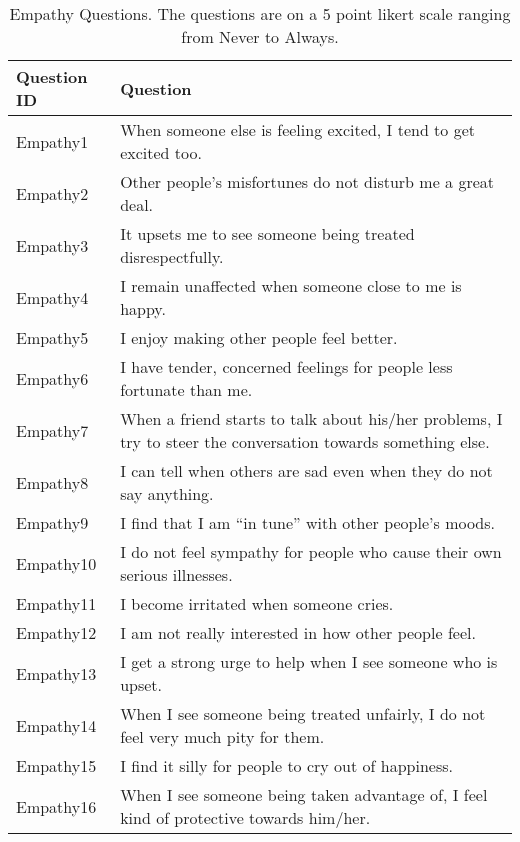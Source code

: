 \begin{table}[!hbpt]
    \footnotesize
    \centering
    \begin{tabularx}{\linewidth}{l|X}
    \toprule
         Question ID & Question \\
         \midrule
         Empathy1 & When someone else is feeling excited, I tend to get excited too. \\
         Empathy2 & Other people’s misfortunes do not disturb me a great deal. \\
         Empathy3 & It upsets me to see someone being treated disrespectfully. \\
         Empathy4 & I remain unaffected when someone close to me is happy. \\
         Empathy5 & I enjoy making other people feel better. \\
         Empathy6 & I have tender, concerned feelings for people less fortunate than me. \\
         Empathy7 & When a friend starts to talk about his/her problems, I try to steer the conversation towards something else. \\
         Empathy8 & I can tell when others are sad even when they do not say anything. \\
         Empathy9 & I find that I am “in tune” with other people’s moods. \\
         Empathy10 & I do not feel sympathy for people who cause their own serious illnesses. \\
         Empathy11 & I become irritated when someone cries. \\
         Empathy12 & I am not really interested in how other people feel. \\
         Empathy13 & I get a strong urge to help when I see someone who is upset. \\
         Empathy14 & When I see someone being treated unfairly, I do not feel very much pity for them. \\
         Empathy15 & I find it silly for people to cry out of happiness. \\
         Empathy16 & When I see someone being taken advantage of, I feel kind of protective towards him/her. \\
    \bottomrule
    \end{tabularx}
    \caption{Empathy Questions. The questions are on a 5 point likert scale ranging from Never to Always.}
    \label{app:empathy-questions}
\end{table}
